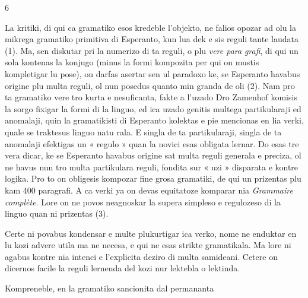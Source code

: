 \begin{VUpage}[10]{6}

La kritiki, di qui ca gramatiko esos kredeble l'objekto,\nl
ne falios opozar ad olu la mikrega gramatiko primitiva di\nl
Esperanto, kun lua dek e sis reguli tante laudata (1). Ma,\nl
sen diskutar pri la numerizo di ta reguli, o plu \textit{vere para}\cc
\textit{grafi}, di qui un sola kontenas la konjugo (minus la formi\nl
kompozita per qui on mustis kompletigar lu pose), on darfas\nl
asertar sen ul paradoxo ke, se Esperanto havabus origine\nl
plu multa reguli, ol nun posedus quanto min granda de\nl
oli (2). Nam pro ta gramatiko vere tro kurta e nesuficanta,\nl
fakte a l'uzado Dro Zamenhof komisis la sorgo fixigar la\nl
formi di la linguo, ed ica uzado genitis multega partikularaji\nl
ed anomalaji, quin la gramatikisti di Esperanto kolektas e\nl
pie mencionas en lia verki, quale se traktesus linguo natu\cc
rala. E singla de ta partikularaji, singla de ta anomalaji\nl
efektigas un « regulo » quan la novici esas obligata lernar.\nl
Do esas tre vera dicar, ke se Esperanto havabus origine sat\nl
multa reguli generala e preciza, ol ne havus nun tro multa\nl
partikulara reguli, fondita sur « uzi » disparata e kontre\cc
logika. Pro to on obligesis kompozar fine grosa gramatiki,\nl
de qui un prizentas plu kam 400 paragrafi. A ca verki ya\nl
on devas equitatoze komparar nia \textit{Grammaire complète}. Lore\nl
on ne povos neagnoskar la supera simpleso e regulozeso di\nl
la linguo quan ni prizentas (3).

Certe ni povabus kondensar e multe plukurtigar ica verko,\nl
nome ne enduktar en lu kozi advere utila ma ne necesa, e\nl
qui ne esas strikte gramatikala. Ma lore ni agabus kontre\nl
nia intenci e l'explicita deziro di multa samideani. Cetere\nl
on dicernos facile la reguli lernenda del kozi nur lektebla\nl
o lektinda.

Kompreneble, en la gramatiko sancionita dal permananta
\parplein
\end{VUpage}

